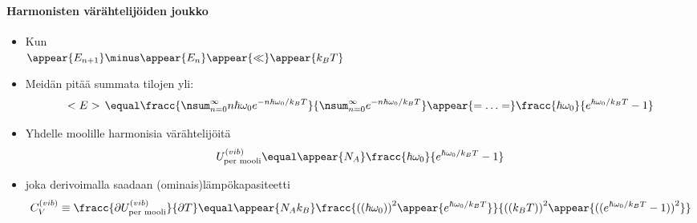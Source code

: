 \begin{frame}
\frametitle{\texorpdfstring{\culine[\sectiontitleulinecolor]{\sectiontitle}}{\sectiontitle} }
\framesubtitle{Harmonisten värähtelijöiden joukko}
\appear{}

\begin{itemize}[itemsep=1.7mm]
	\item Kun  \\   $\appear{E_{n+1}} \minus \appear{E_n} \appear{\ll} \appear{k_B T}$  
	
	\item Meidän pitää summata tilojen yli: %
\[
<E>\,  \equal  \fracc{\nsum_{n=0}^{\infty} n \hbar \omega_{0} e^{-n \hbar \omega_{0} / k_{B} T}}{\nsum_{n=0}^{\infty} e^{-n \hbar \omega_{0} / k_{B} T}} \appear{=\ldots=} \fracc{\hbar \omega_{0}}{e^{\hbar \omega_{0} / k_{B} T}-1}
\]

\item Yhdelle moolille harmonisia värähtelijöitä
\[
U_{\text {per mooli}}^{(vib)}  \equal \appear{N_{A}} \fracc{\hbar \omega_{0}}{e^{\hbar \omega_{0} / k_{B} T}-1}
\]

\item[] joka derivoimalla saadaan (ominais)lämpökapasiteetti
\[
C_{V}^{(vib)}  \equiv \fracc{\partial U_\text{per mooli}^{(vib)}}{\partial T}
 \equal \appear{N_{A} k_{B}} \fracc{ \textrm{((} \hbar \omega_{0} \textrm{))}^{2} \appear{e^{\hbar \omega_{0} / k_{B} T}} }{ \textrm{((} k_{B} T \textrm{))} ^{2}\appear{ \textrm{((} e^{\hbar \omega_{0} / k_{B} T}-1 \textrm{))} ^{2}} }
\]
\end{itemize}

\endofslide 
\end{frame}

